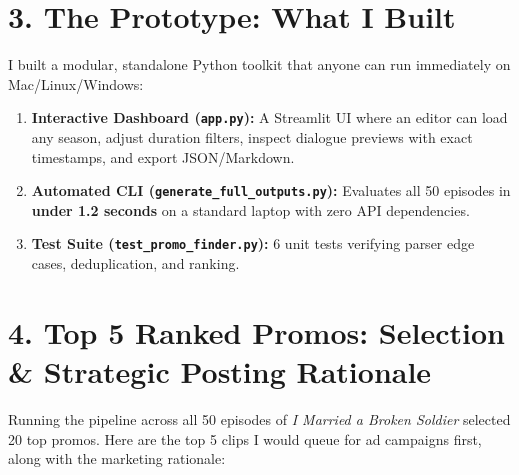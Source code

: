 \documentclass[9.5pt,a4paper]{article}
\begin{document}
\section{3. The Prototype: What I Built}
I built a modular, standalone Python toolkit that anyone can run immediately on Mac/Linux/Windows:
\begin{enumerate}
    \item \textbf{Interactive Dashboard (\texttt{app.py}):} A Streamlit UI where an editor can load any season, adjust duration filters, inspect dialogue previews with exact timestamps, and export JSON/Markdown.
    \item \textbf{Automated CLI (\texttt{generate\_full\_outputs.py}):} Evaluates all 50 episodes in \textbf{under 1.2 seconds} on a standard laptop with zero API dependencies.
    \item \textbf{Test Suite (\texttt{test\_promo\_finder.py}):} 6 unit tests verifying parser edge cases, deduplication, and ranking.
\end{enumerate}

\newpage

\section{4. Top 5 Ranked Promos: Selection \& Strategic Posting Rationale}
Running the pipeline across all 50 episodes of \textit{I Married a Broken Soldier} selected 20 top promos. Here are the top 5 clips I would queue for ad campaigns first, along with the marketing rationale:
\end{document}
